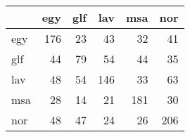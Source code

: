 \begin{tabular}{lrrrrr}
\hline
     &   egy &   glf &   lav &   msa &   nor \\
\hline
 egy &   176 &    23 &    43 &    32 &    41 \\
 glf &    44 &    79 &    54 &    44 &    35 \\
 lav &    48 &    54 &   146 &    33 &    63 \\
 msa &    28 &    14 &    21 &   181 &    30 \\
 nor &    48 &    47 &    24 &    26 &   206 \\
\hline
\end{tabular}